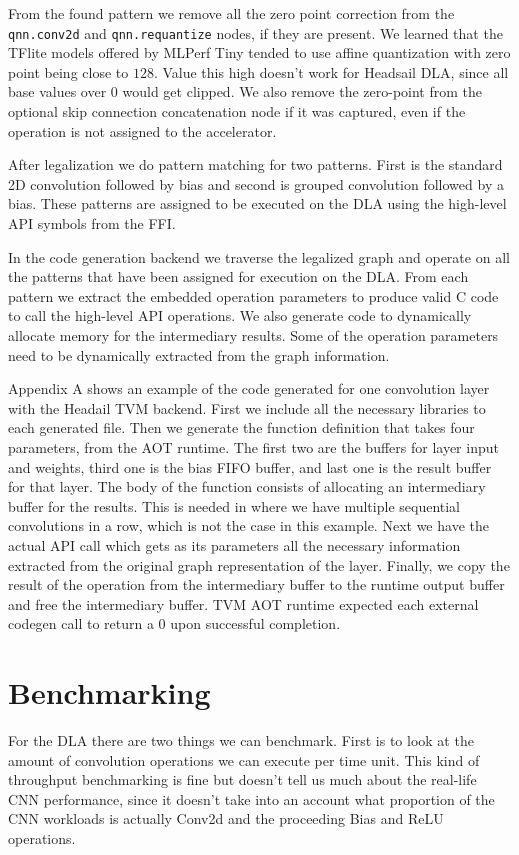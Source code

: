 \documentclass[12pt,a4paper,english
]{tunithesis}
\begin{document}
From the found pattern we remove all the zero point correction from the \texttt{qnn.conv2d} and \texttt{qnn.requantize} nodes, if they are present. We learned that the TFlite models offered by MLPerf Tiny tended to use affine quantization with zero point being close to $128$. Value this high doesn't work for Headsail DLA, since all base values over $0$ would get clipped.
We also remove the zero-point from the optional skip connection concatenation node if it was captured, even if the operation is not assigned to the accelerator.

After legalization we do pattern matching for two patterns. First is the standard 2D convolution followed by bias and second is grouped convolution followed by a bias. These patterns are assigned to be executed on the DLA using the high-level API symbols from the FFI.

In the code generation backend we traverse the legalized graph and operate on all the patterns that have been assigned for execution on the DLA.
From each pattern we extract the embedded operation parameters to produce valid C code to call the high-level API operations. We also generate code to dynamically allocate memory for the intermediary results.
Some of the operation parameters need to be dynamically extracted from the graph information.

Appendix A shows an example of the code generated for one convolution layer with the Headail TVM backend. First we include all the necessary libraries to each generated file. Then we generate the function definition that takes four parameters, from the AOT runtime. The first two are the buffers for layer input and weights, third one is the bias FIFO buffer, and last one is the result buffer for that layer.
The body of the function consists of allocating an intermediary buffer for the results. This is needed in where we have multiple sequential convolutions in a row, which is not the case in this example.
Next we have the actual API call which gets as its parameters all the necessary information extracted from the original graph representation of the layer. Finally, we copy the result of the operation from the intermediary buffer to the runtime output buffer and free the intermediary buffer. TVM AOT runtime expected each external codegen call to return a 0 upon successful completion.

\section{Benchmarking}
For the DLA there are two things we can benchmark. First is to look at the amount of convolution operations we can execute per time unit. This kind of throughput benchmarking is fine but doesn't tell us much about the real-life CNN performance, since it doesn't take into an account what proportion of the CNN workloads is actually Conv2d and the proceeding Bias and ReLU operations.
\end{document}
